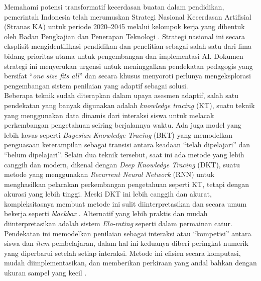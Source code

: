 \documentclass[12pt,a4paper,oneside]{book}
\begin{document}
Memahami potensi transformatif kecerdasan buatan dalam pendidikan, pemerintah Indonesia telah merumuskan Strategi Nasional Kecerdasan Artifisial (Stranas KA) untuk periode 2020--2045 melalui kelompok kerja yang dibentuk oleh Badan Pengkajian dan Penerapan Teknologi \autocite{BPPT2020}. Strategi nasional ini secara eksplisit mengidentifikasi pendidikan dan penelitian sebagai salah satu dari lima bidang prioritas utama untuk pengembangan dan implementasi AI. Dokumen strategi ini menyerukan urgensi untuk meninggalkan pendekatan pedagogis yang bersifat “\textit{one size fits all}” dan secara khusus menyoroti perlunya mengeksplorasi pengembangan sistem penilaian yang adaptif sebagai solusi.\\

Beberapa teknik sudah diterapkan dalam upaya asesmen adaptif, salah satu pendekatan yang banyak digunakan adalah \textit{knowledge tracing} (KT), suatu teknik yang menggunakan data dinamis dari interaksi siswa untuk melacak perkembangan pengetahuan seiring berjalannya waktu. Ada juga model yang lebih lawas seperti \textit{Bayesian Knowledge Tracing} (BKT) yang memodelkan penguasaan keterampilan sebagai transisi antara keadaan “telah dipelajari” dan “belum dipelajari”. Selain dua teknik tersebut, saat ini ada metode yang lebih canggih dan modern, dikenal dengan \textit{Deep Knowledge Tracing} (DKT), suatu metode yang menggunakan \textit{Recurrent Neural Network} (RNN) untuk menghasilkan pelacakan perkembangan pengetahuan seperti KT, tetapi dengan akurasi yang lebih tinggi. Meski DKT ini lebih canggih dan akurat, kompleksitasnya membuat metode ini sulit diinterpretasikan dan secara umum bekerja seperti \textit{blackbox} \autocite{Minn2022}. Alternatif yang lebih praktis dan mudah diinterpretasikan adalah sistem \textit{Elo-rating} seperti dalam permainan catur. Pendekatan ini memodelkan penilaian sebagai interaksi atau “kompetisi” antara siswa dan \textit{item} pembelajaran, dalam hal ini keduanya diberi peringkat numerik yang diperbarui setelah setiap interaksi. Metode ini efisien secara komputasi, mudah diimplementasikan, dan memberikan perkiraan yang andal bahkan dengan ukuran sampel yang kecil \autocite{Vesin2022}.\\
\end{document}
